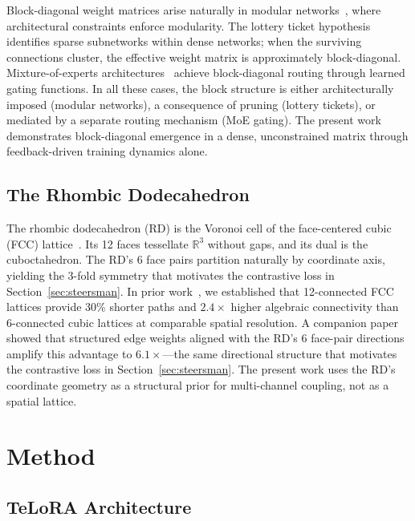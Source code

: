 \documentclass[11pt]{article}
\begin{document}
Block-diagonal weight matrices arise naturally in modular
networks~\cite{clune2013, amer2019modular}, where architectural
constraints enforce modularity. The lottery ticket
hypothesis~\cite{frankle2019lottery} identifies sparse subnetworks
within dense networks; when the surviving connections cluster, the
effective weight matrix is approximately block-diagonal. Mixture-of-experts
architectures~\cite{fedus2022switch, lepikhin2021gshard} achieve
block-diagonal routing through learned gating functions. In all these
cases, the block structure is either architecturally imposed (modular
networks), a consequence of pruning (lottery tickets), or mediated by
a separate routing mechanism (MoE gating). The present work
demonstrates block-diagonal emergence in a dense, unconstrained matrix
through feedback-driven training dynamics alone.

\subsection{The Rhombic Dodecahedron}

The rhombic dodecahedron (RD) is the Voronoi cell of the
face-centered cubic (FCC) lattice~\cite{conway1999}. Its 12 faces
tessellate $\mathbb{R}^3$ without gaps, and its dual is the
cuboctahedron. The RD's 6 face pairs partition naturally by coordinate
axis, yielding the 3-fold symmetry that motivates the contrastive loss
in Section~\ref{sec:steersman}. In prior
work~\cite{bielec2026shape}, we established that 12-connected FCC
lattices provide 30\% shorter paths and $2.4\times$ higher algebraic
connectivity than 6-connected cubic lattices at comparable spatial
resolution. A companion paper~\cite{bielec2026weights} showed that
structured edge weights aligned with the RD's 6 face-pair directions
amplify this advantage to $6.1\times$---the same directional structure
that motivates the contrastive loss in
Section~\ref{sec:steersman}. The present work uses the RD's coordinate
geometry as a structural prior for multi-channel coupling, not as a
spatial lattice.


\section{Method}
\label{sec:method}

\subsection{TeLoRA Architecture}
\end{document}
